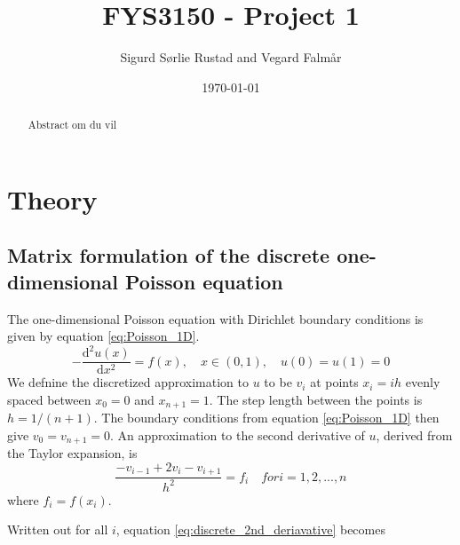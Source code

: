 \documentclass[reprint, english,notitlepage]{revtex4-1}  %
\begin{document}
\title{FYS3150 - Project 1}
\date{\today}
\author{Sigurd Sørlie Rustad and Vegard Falmår}


\newpage

\begin{abstract}
Abstract om du vil
\end{abstract}
\maketitle                                %


\section{Theory}

\subsection{Matrix formulation of the discrete one-dimensional Poisson equation}
The one-dimensional Poisson equation with Dirichlet boundary conditions is given by equation \ref{eq:Poisson_1D}.
\begin{equation}
  \label{eq:Poisson_1D}
  - \frac{\mathrm d^2 u(x)}{\mathrm d x^2} = f(x), \quad x \in (0, 1), \quad u(0) = u(1) = 0
\end{equation}
We defnine the discretized approximation to $u$ to be $v_i$ at points $x_i = i h$ evenly spaced between $x_0 = 0$ and $x_{n+1} = 1$. The step length between the points is $h = 1/(n + 1)$. The boundary conditions from equation \ref{eq:Poisson_1D} then give $v_0 = v_{n+1} = 0$. An approximation to the second derivative of $u$, derived from the Taylor expansion, is
\begin{equation}
  \label{eq:discrete_2nd_deriavative}
  \frac{-v_{i-1} + 2 v_i - v_{i+1}}{h^2} = f_i \quad for i = 1, 2, ..., n
\end{equation}
where $f_i = f(x_i)$.

Written out for all $i$, equation \ref{eq:discrete_2nd_deriavative} becomes
\end{document}
